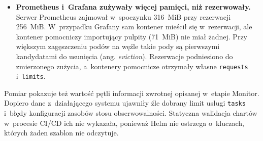 \begin{itemize}
    \item \textbf{Prometheus i~Grafana zużywały więcej pamięci, niż rezerwowały.} Serwer Prometheus zajmował w~spoczynku 316~MiB przy rezerwacji 256~MiB. W~przypadku Grafany sam kontener mieścił się w~rezerwacji, ale kontener pomocniczy importujący pulpity (71~MiB) nie miał żadnej. Przy większym zagęszczeniu podów na węźle takie pody są pierwszymi kandydatami do usunięcia (ang. \textit{eviction}). Rezerwacje podniesiono do zmierzonego zużycia, a~kontenery pomocnicze otrzymały własne \texttt{requests} i~\texttt{limits}.
\end{itemize}

Pomiar pokazuje też wartość pętli informacji zwrotnej opisanej w~etapie Monitor. Dopiero dane z~działającego systemu ujawniły źle dobrany limit usługi \texttt{tasks} i~błędy konfiguracji zasobów stosu obserwowalności. Statyczna walidacja chartów w~procesie CI/CD ich nie wykazała, ponieważ Helm nie ostrzega o~kluczach, których żaden szablon nie odczytuje.
